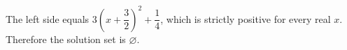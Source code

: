 The left side equals $3(x+\dfrac{3}{2})^2+\dfrac{1}{4}$, which is strictly positive for every real $x$. Therefore the solution set is $\boxed{\varnothing}$.
